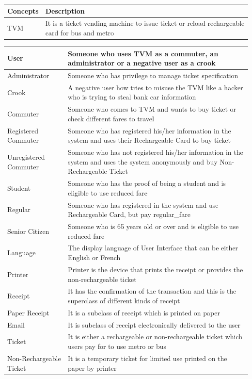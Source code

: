\documentclass[a4paper,12pt]{report}
\begin{document}
\setlength{\tabcolsep}{18pt}
\renewcommand{\arraystretch}{1.5}
\begin{tabular}[H]{ |p{3cm}|p{12cm}| }
	\hline
	\textbf{Concepts}  & \textbf{Description}  \\
	\hline
	TVM & It is a ticket vending machine to issue ticket or reload rechargeable card for bus and metro
	\\
	\hline
\end{tabular}

\setlength{\tabcolsep}{18pt}
\renewcommand{\arraystretch}{1.5}
\begin{tabular}[H]{ |p{3cm}|p{12cm}| }
	\hline
	User & Someone who uses TVM as a commuter, an administrator or a negative user as a crook
	\\
	\hline
	Administrator & Someone who has privilege to manage ticket specification
	\\
	\hline
	Crook & A negative user how tries to misuse the TVM like a hacker who is trying to steal bank car information
	\\
	\hline
	Commuter & Someone who comes to TVM and wants to buy ticket or check different fares to travel
	\\
	\hline
	Registered Commuter & Someone who has registered his/her information in the system and uses their Rechargeable Card to buy ticket
	\\
	\hline
	Unregistered Commuter & Someone who has not registered his/her information in the system and uses the system anonymously and buy Non-Rechargeable Ticket
	\\
	\hline
	Student & Someone who has the proof of being a student and is eligible to use reduced fare
	\\
	\hline
	Regular & Someone who has registered in the system and use Rechargeable Card, but pay \gls{regular_fare}
	
	\\
	\hline
	Senior Citizen & Someone who is 65 years old or over and is eligible to use reduced fare
	\\
	\hline
	Language & The display language of User Interface that can be either English or French
	\\
	\hline
	Printer & Printer is the device that prints the receipt or provides the non-rechargeable ticket
	\\
	\hline 
	Receipt & It has the confirmation of the transaction and this is the superclass of different kinds of receipt
	\\
	\hline
	Paper Receipt & It is a subclass of receipt which is printed on paper
	\\
	\hline
	Email & It is subclass of receipt electronically delivered to the user
	\\
	\hline
	Ticket & It is either a rechargeable or non-rechargeable ticket which users pay for to use metro or bus
	\\
	\hline
	Non-Rechargeable Ticket & It is a temporary ticket for limited use printed on the paper by printer
	\\
	\hline
\end{tabular}
	
\end{document}
